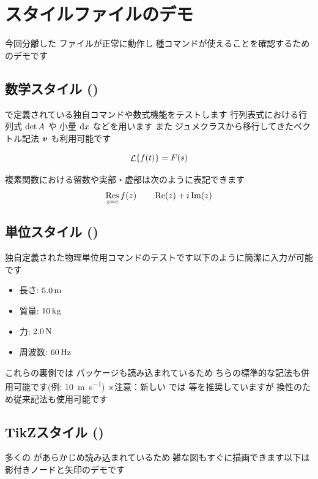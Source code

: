 \documentclass[../../main]{subfiles}
\begin{document}
\section{スタイルファイルのデモ}

今回分離した  ファイルが正常に動作し\c 各種コマンドが使えることを確認するためのデモです\p

\subsection{数学スタイル ()}
 で定義されている独自コマンドや数式機能をテストします\p
行列表式における行列式 \(\mathop{\mathrm{det}} A\) や\c 微小量 \(\mathrm{d} x\) などを用います\p
また\c レジュメクラスから移行してきたベクトル記法 \(\mbox{\boldmath $v$}\) も利用可能です\p

\begin{equation}
  \mathop{\mathcal{L}} \{ f(t) \} = F(s)
\end{equation}

複素関数における留数や実部・虚部は次のように表記できます\p
\begin{equation}
  \mathop{\mathrm{Res}}_{z=c} f(z) \qquad \mathop{\mathrm{Re}}(z) + i \mathop{\mathrm{Im}}(z)
\end{equation}

\subsection{単位スタイル ()}
独自定義された物理単位用コマンドのテストです\p 以下のように簡潔に入力が可能です\p
\begin{itemize}
  \item 長さ: \( 5.0 \, \mathrm{m} \)
  \item 質量: \( 10 \, \mathrm{k}\mathrm{g} \)
  \item 力: \( 2.0 \, \mathrm{N} \)
  \item 周波数: \( 60 \, \mathrm{Hz} \)
\end{itemize}

これらの裏側では  パッケージも読み込まれているため\c そちらの標準的な記法も併用可能です(例: \SI{10}{\meter\per\second})\p
※注意：新しい  では  等を推奨していますが\c 互換性のため従来記法も使用可能です\p

\subsection{TikZスタイル ()}
多くの  があらかじめ読み込まれているため\c 複雑な図もすぐに描画できます\p 以下は影付きノードと矢印のデモです\p
\end{document}
